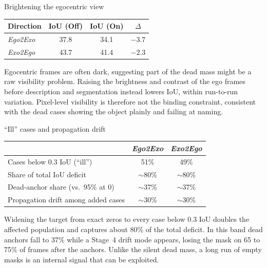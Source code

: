 \documentclass[professionalfonts,aspectratio=169]{beamer}
\begin{document}
\begin{frame}[t]
\begin{center}
{\large Brightening the egocentric view}
\end{center}
\vfill
\begin{center}
\small
\setlength{\tabcolsep}{10pt}
\begin{tabular}{lccc}
  \toprule
  Direction & IoU (Off) & IoU (On) & $\Delta$ \\
  \midrule
  \textit{Ego2Exo} & 37.8 & 34.1 & $-3.7$ \\
  \textit{Exo2Ego} & 43.7 & 41.4 & $-2.3$ \\
  \bottomrule
\end{tabular}
\end{center}
\vspace{0.8em}
\begin{center}
\begin{minipage}{0.88\textwidth}
\small
Egocentric frames are often dark, suggesting part of the dead mass might be a raw visibility problem. Raising the brightness and contrast of the ego frames before description and segmentation instead lowers IoU, within run-to-run variation. Pixel-level visibility is therefore not the binding constraint, consistent with the dead cases showing the object plainly and failing at naming.
\end{minipage}
\end{center}
\vfill
\end{frame}

\begin{frame}[t]
\begin{center}
{\large ``Ill'' cases and propagation drift}
\end{center}
\vfill
\begin{center}
\small
\setlength{\tabcolsep}{8pt}
\begin{tabular}{lcc}
  \toprule
   & \textit{Ego2Exo} & \textit{Exo2Ego} \\
  \midrule
  Cases below 0.3 IoU (``ill'')      & 51\% & 49\% \\
  Share of total IoU deficit         & $\sim$80\% & $\sim$80\% \\
  Dead-anchor share (vs.\ 95\% at 0) & $\sim$37\% & $\sim$37\% \\
  Propagation drift among added cases & $\sim$30\% & $\sim$30\% \\
  \bottomrule
\end{tabular}
\end{center}
\vspace{0.8em}
\begin{center}
\begin{minipage}{0.88\textwidth}
\small
Widening the target from exact zeros to every case below 0.3 IoU doubles the affected population and captures about 80\% of the total deficit. In this band dead anchors fall to 37\% while a Stage~4 drift mode appears, losing the mask on 65 to 75\% of frames after the anchors. Unlike the silent dead mass, a long run of empty masks is an internal signal that can be exploited.
\end{minipage}
\end{center}
\vfill
\end{frame}
\end{document}
